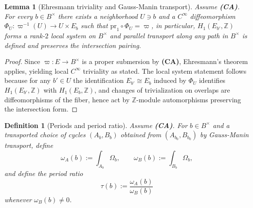 \documentclass[11pt]{article}
\newtheorem{lemma}[theorem]{Lemma}
\newtheorem{definition}[theorem]{Definition}
\theoremstyle{remark}
\begin{document}
{\begin{lemma}[Ehresmann triviality and Gauss-Manin transport]\label{lem:ehresmann_triviality}
Assume \textbf{(CA)}. For every $b\in B^\times$ there exists a neighborhood $U\ni b$ and a $C^\infty$ diffeomorphism $\Phi_U:\varpi^{-1}(U)\to U\times E_b$ such that $\mathrm{pr}_1\circ \Phi_U=\varpi$, in particular, $H_1(E_{b'},\mathbb{Z})$ forms a rank-$2$ local system on $B^\times$ and parallel transport along any path in $B^\times$ is defined and preserves the intersection pairing.
\end{lemma}
\begin{proof}
Since $\varpi:E\to B^\times$ is a proper submersion by \textbf{(CA)}, Ehresmann's theorem applies, yielding local $C^\infty$ triviality as stated. The local system statement follows because for any $b'\in U$ the identification $E_{b'}\cong E_b$ induced by $\Phi_U$ identifies $H_1(E_{b'},\mathbb{Z})$ with $H_1(E_b,\mathbb{Z})$, and changes of trivialization on overlaps are diffeomorphisms of the fiber, hence act by $\mathbb{Z}$-module automorphisms preserving the intersection form.
\end{proof}

\begin{definition}[Periods and period ratio]\label{def:period_ratio_def}
Assume \textbf{(CA)}. For $b\in B^\times$ and a transported choice of cycles $(A_b,B_b)$ obtained from $(A_{b_0},B_{b_0})$ by Gauss-Manin transport, define
\begin{equation}\label{eq:periods_def_app}
\omega_A(b):=\int_{A_b}\Omega_b,\qquad \omega_B(b):=\int_{B_b}\Omega_b,
\end{equation}
and define the period ratio
\begin{equation}\label{eq:tau_period_def_app}
\tau(b):=\frac{\omega_A(b)}{\omega_B(b)}
\end{equation}
whenever $\omega_B(b)\neq 0$.
\end{definition}

}
\end{document}
